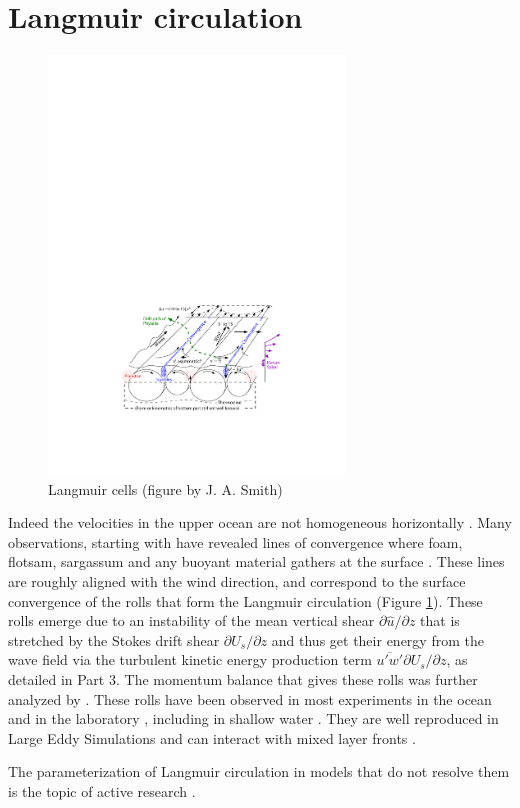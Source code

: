 \section{Langmuir circulation}
\begin{figure}
\centerline{\includegraphics[width=0.7\textwidth]{FIGS_CH_AIRSEA/SmithStoryOfMixing.pdf}}
  \caption{Langmuir cells (figure by J. A. Smith)} \label{fig_Langmuir}
\end{figure}
Indeed the velocities in the upper ocean are not homogeneous horizontally \citep{Weller&al.1985}. Many observations, starting with 
\cite{Langmuir1938} have revealed lines of convergence where foam, flotsam, sargassum and any buoyant material gathers at the surface \citep{Thorpe&al.2003b}. 
These lines are roughly aligned with the wind direction, and correspond to the surface convergence of the rolls that form the Langmuir circulation (Figure \ref{fig_Langmuir}). These rolls emerge due to an instability of the mean vertical shear $\partial \widehat{u}/ \partial z$ that is  stretched by the Stokes 
drift shear $\partial U_s/ \partial z$  and thus get their energy from the wave field via the turbulent kinetic energy production term $\overline{u'w'}\partial U_s/\partial z$, as detailed in Part 3. The momentum balance that gives 
these rolls was further analyzed by \cite{Suzuki&Fox-Kemper2016}. These rolls have been observed in most experiments in the ocean and in the laboratory \citep[e.g.][]{Thorpe1992,Melville&al.1998,Smith1999}, including in shallow water \citep{Marmorino&al.2005}. They are well reproduced in Large Eddy Simulations \citep[e.g.][]{Noh&al.2004,Harcourt&DAsaro2006,Sullivan&McWilliams2010} and can interact with mixed layer fronts \citep{Suzuki&al.2016}.

The parameterization of Langmuir circulation in models that do not resolve them is the topic of active research \citep[e.g.][]{Li&Fox-Kemper2017}. 


